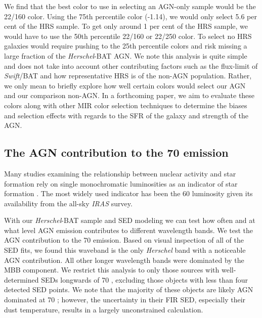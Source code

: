 \documentclass[fleqn, usenatbib]{mnras}
\newcommand{\herschel}{\emph{Herschel}}
\newcommand{\swift}{\textit{Swift}}
\begin{document}
We find that the best color to use in selecting an AGN-only sample would be the 22/160 color. Using the 75th percentile color (-1.14), we would only select 5.6 per cent of the HRS sample. To get only around 1 per cent of the HRS sample, we would have to use the 50th percentile 22/160 or 22/250 color. To select no HRS galaxies would require pushing to the 25th percentile colors and risk missing a large fraction of the \herschel-BAT AGN. We note this analysis is quite simple and does not take into account other contributing factors such as the flux-limit of \swift/BAT and how representative HRS is of the non-AGN population. Rather, we only mean to briefly explore how well certain colors would select our AGN and our comparison non-AGN. In a forthcoming paper, we aim to evaluate these colors along with other MIR color selection techniques \cite[e.g.][]{Donley:2012qy, Stern:2012mz} to determine the biases and selection effects with regards to the SFR of the galaxy and strength of the AGN.

\subsection{The AGN contribution to the 70 \micron{} emission}\label{sec:agn_70_contribution}
Many studies examining the relationship between nuclear activity and star formation rely on single monochromatic luminosities as an indicator of star formation \cite[e.g.][]{Netzer:2007ve, Netzer:2009lr, Rosario:2012fr}. The most widely used indicator has been the 60 \micron{} luminosity given its availability from the all-sky \textit{IRAS} survey. 

With our \herschel-BAT sample and SED modeling we can test how often and at what level AGN emission contributes to different wavelength bands. We test the AGN contribution to the 70 \micron{} emission. Based on visual inspection of all of the SED fits, we found this waveband is the only \herschel{} band with a noticeable AGN contribution. All other longer wavelength bands were dominated by the MBB component. We restrict this analysis to only those sources with well-determined SEDs longwards of 70 \micron, excluding those objects with less than four detected SED points. We note that the majority of these objects are likely AGN dominated at 70 \micron; however, the uncertainty in their FIR SED, especially their dust temperature, results in a largely unconstrained calculation.
\end{document}
